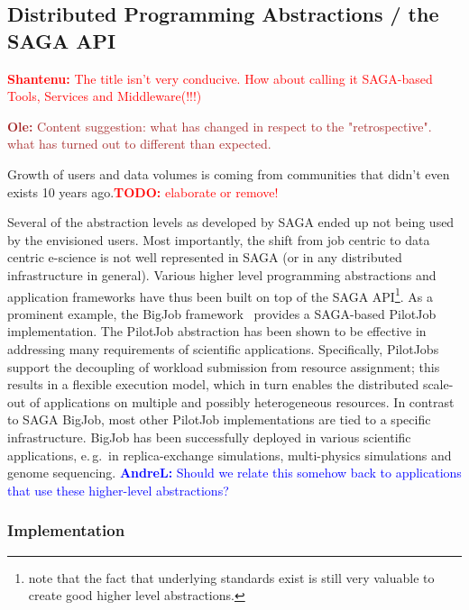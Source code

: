\documentclass{article}
\newcommand{\B}[1]{\textbf{#1}}
\newcommand{\todo}[1]{{\textcolor{red}{\B{TODO:} #1 }}}
\newcommand{\jhanote}[1]{{\textcolor{red}{     \B{Shantenu:} #1 }}}
\newcommand{\alnote}[1]{{\textcolor{blue}{    \B{AndreL:  } #1 }}}
\newcommand{\ownote}[1]{{\textcolor{Brown}{   \B{Ole:     } #1 }}}
\newcommand{\todo}[1]{}
\newcommand{\jhanote}[1]{}
\newcommand{\alnote}[1]{}
\newcommand{\ownote}[1]{}
\begin{document}
 \subsection{Distributed Programming Abstractions / the SAGA API}
 
  \jhanote{The title isn't very conducive. How about calling it SAGA-based
  Tools, Services and Middleware(!!!)}

  \ownote{Content suggestion: what has changed in respect to the
  "retrospective". what has turned out to different than expected.}

  Growth of users and data volumes is coming from communities that
  didn't even exists 10 years ago.\todo{elaborate or remove!}
 
  Several of the abstraction levels as developed by SAGA ended up not
  being used by the envisioned users.  Most importantly, the shift
  from job centric to data centric e-science is not well represented
  in SAGA (or in any distributed infrastructure in general).  Various
  higher level programming abstractions and application frameworks
  have thus been built on top of the SAGA API\footnote{note that the
  fact that underlying standards exist is still very valuable to
  create good higher level abstractions.}.  As a prominent example,
  the BigJob framework~\cite{saga_bigjob_condor_cloud}  provides a
  SAGA-based PilotJob implementation. The PilotJob abstraction has
  been shown to be effective in addressing many requirements of
  scientific applications.  Specifically, PilotJobs support the
  decoupling of workload submission from resource assignment; this
  results in a flexible execution model, which in turn enables the
  distributed scale-out of applications on multiple and possibly
  heterogeneous resources. In contrast to SAGA BigJob, most other
  PilotJob implementations are tied to a specific infrastructure.
  BigJob has been successfully deployed in various scientific
  applications, e.\,g.\ in replica-exchange simulations, multi-physics
  simulations and genome sequencing.
  \alnote{Should we relate this somehow back to applications that use 
  these higher-level abstractions?	}

  \subsubsection{Implementation}
\end{document}
